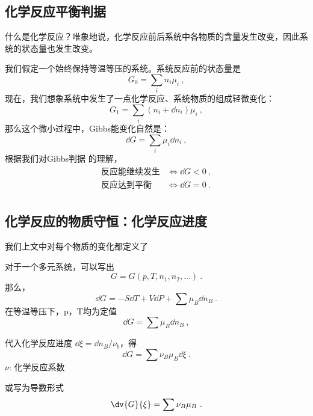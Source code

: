 
\begin{issues}
\issueDraft
\end{issues}


\subsection{化学反应平衡判据}
什么是化学反应？唯象地说，化学反应前后系统中各物质的含量发生改变，因此系统的状态量也发生改变。

我们假定一个始终保持等温等压的系统。系统反应前的状态量是 
$$G_0 = \sum_i n_i \mu_i~,$$
现在，我们想象系统中发生了一点化学反应、系统物质的组成轻微变化：
$$G_1 = \sum_i (n_i + \dd n_i) \mu_i~,$$
那么这个微小过程中，Gibbs能变化自然是：
$$\dd G = \sum_i \mu_i \dd n_i~,$$
根据我们对Gibbs判据  的理解，
$$
\begin{aligned}
\text{反应能继续发生} &\Longleftrightarrow \dd G < 0~,\\
\text{反应达到平衡} &\Longleftrightarrow \dd G = 0~.\\
\end{aligned}
$$

\subsection{化学反应的物质守恒：化学反应进度}
我们上文中对每个物质的变化都定义了


对于一个多元系统，可以写出
\begin{equation}
G=G(p,T,n_1,n_2,...)~.
\end{equation}
那么，
\begin{equation}
\dd G=-S \dd T +V \dd P + \sum \mu_B \dd n_B~.
\end{equation}
在等温等压下，p，T均为定值
\begin{equation}
\dd G=\sum \mu_B \dd n_B~,
\end{equation}

代入化学反应进度 $\dd \xi=\dd n_B/\nu_b$，得
\begin{equation}
\dd G=\sum \nu_B \mu_B \dd \xi~.
\end{equation}
$\nu$: 化学反应系数

或写为导数形式
\begin{equation}
\dv{G}{\xi}=\sum \nu_B \mu_B~.
\end{equation}

